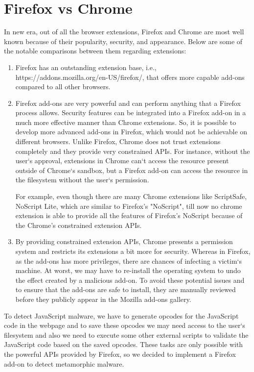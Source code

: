 \section{Firefox vs Chrome} 

In new era, out of all the browser extensions, Firefox and Chrome are most well known because of their popularity, security, and appearance. Below are some of the notable comparisons between them regarding extensions: 
\begin{enumerate}
\item Firefox has an outstanding extension base, i.e., https://addons.mozilla.org/en-US/firefox/, that offers more capable add-ons compared to all other browsers. 
\item Firefox add-ons are very powerful and can perform anything that a Firefox process allows. Security features can be integrated into a Firefox add-on in a much more effective manner than Chrome extensions. So, it is possible to develop more advanced add-ons in Firefox, which would not be achievable on different browsers. Unlike Firefox, Chrome does not trust extensions completely and they provide very constrained APIs. For instance, without the user`s approval, extensions in Chrome can`t access the resource present outside of Chrome`s sandbox, but a Firefox add-on can access the resource in the filesystem without the user`s permission. 

For example, even though there are many Chrome extensions like ScriptSafe, NoScript Lite, which are similar to Firefox's "NoScript", till now no chrome extension is able to provide all the features of Firefox's NoScript because of the Chrome's constrained extension APIs.
\item By providing constrained extension APIs, Chrome presents a permission system and restricts its extensions a bit more for security. Whereas in Firefox, as the add-ons has more privileges, there are chances of infecting a victim`s machine. At worst, we may have to re-install the operating system to undo the effect created by a malicious add-on. To avoid these potential issues and to ensure that the add-ons are safe to install, they are manually reviewed before they publicly appear in the Mozilla add-ons gallery.
\end{enumerate}

To detect JavaScript malware, we have to generate opcodes for the JavaScript code in the webpage and to save these opcodes we may need access to the user`s filesystem and also we need to execute some other external scripts to validate the JavaScript code based on the saved opcodes. These tasks are only possible with the powerful APIs provided by Firefox, so we decided to implement a Firefox add-on to detect metamorphic malware.
